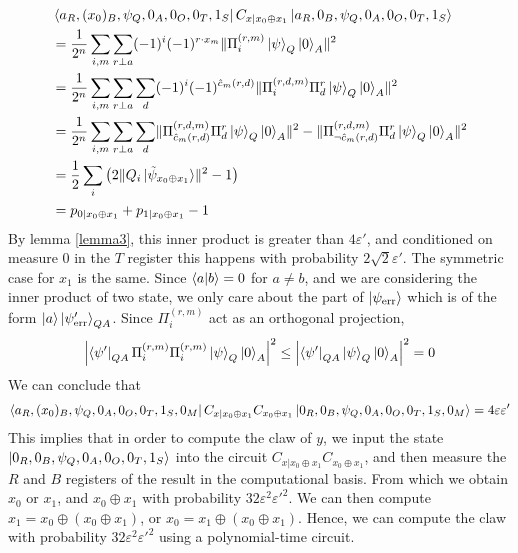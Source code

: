 \documentclass{article}
\begin{document}
\begin{align}&\bra{a_{R},(x_{0})_{B},\psi_{Q},0_{A},0_{O},0_{T},1_{S}}C_{x|x_{0}\oplus x_{1}}\ket{a_{R},0_{B},\psi_{Q},0_{A},0_{O},0_{T},1_{S}}\\
&=\frac{1}{2^{n}}\sum_{i,m}\sum_{r\perp a}(-1)^{i}(-1)^{r\cdot x_{m}}\lVert \Pi^{(r,m)}_{i}\ket{\psi}_{Q}\ket{0}_{A} \rVert^{2}\\
&=\frac{1}{2^{n}}\sum_{i,m}\sum_{r\perp a}\sum_{d}(-1)^{i}(-1)^{\hat{c}_{m}(r,d)}\lVert \Pi^{(r,d,m)}_{i}\Pi^{r}_{d}\ket{\psi}_{Q}\ket{0}_{A} \rVert^{2}\\
&=\frac{1}{2^{n}}\sum_{i,m}\sum_{r\perp a}\sum_{d}\lVert \Pi^{(r,d,m)}_{\hat{c}_{m}(r,d)}\Pi^{r}_{d}\ket{\psi}_{Q}\ket{0}_{A}\rVert^{2}-\lVert\Pi^{(r,d,m)}_{\neg\hat{c}_{m}(r,d)}\Pi^{r}_{d}\ket{\psi}_{Q}\ket{0}_{A} \rVert^{2}\\
&=\frac{1}{2}\sum_{i}\left(2\lVert Q_{i}\ket{\tilde{\psi}_{x_{0}\oplus x_{1}}}\rVert^{2}-1\right)\\
&=p_{0|x_{0}\oplus x_{1}}+p_{1|x_{0}\oplus x_{1}}-1\end{align} By lemma \ref{lemma3}, this inner product is greater than $4\varepsilon'$, and conditioned on measure $0$ in the $T$ register this happens with probability $2\sqrt{2}\varepsilon'$. The symmetric case for $x_{1}$ is the same. Since $\braket{a|b}=0$ for $a\neq b$, and we are considering the inner product of two state, we only care about the part of $\ket{\psi_{\mathrm{err}}}$ which is of the form $\ket{a}\ket{\psi'_{\mathrm{err}}}_{QA}$. Since $\Pi_{i}^{(r,m)}$ act as an orthogonal projection, \begin{align}\left|\bra{\psi'}_{QA}\Pi_{i}^{(r,m)} \Pi_{i}^{(r,m)}\ket{\psi}_{Q}\ket{0}_{A}\right|^{2}\leq \left|\bra{\psi'}_{QA} \ket{\psi}_{Q}\ket{0}_{A}\right|^{2}=0\end{align} We can conclude that \begin{align}
    \bra{a_{R},(x_{0})_{B},\psi_{Q},0_{A},0_{O},0_{T},1_{S},0_{M}}C_{x|x_{0}\oplus x_{1}}C_{x_{0}\oplus x_{1}}\ket{0_{R},0_{B},\psi_{Q},0_{A},0_{O},0_{T},1_{S},0_{M}}=4\varepsilon\varepsilon'
\end{align} This implies that in order to compute the claw of $y$, we input the state $\ket{0_{R},0_{B},\psi_{Q},0_{A},0_{O},0_{T},1_{S}}$ into the circuit $C_{x|x_{0}\oplus x_{1}}C_{x_{0}\oplus x_{1}}$, and then measure the $R$ and $B$ registers of the result in the computational basis. From which we obtain $x_{0}$ or $x_{1}$, and $x_{0}\oplus x_{1}$ with probability $32\varepsilon^{2} \varepsilon'^{2}$. We can then compute $x_{1} = x_{0} \oplus (x_{0}\oplus x_{1})$, or $x_{0} = x_{1} \oplus (x_{0}\oplus x_{1})$. Hence, we can compute the claw with probability $32\varepsilon^{2}\varepsilon'^{2}$ using a polynomial-time circuit.
\end{document}
